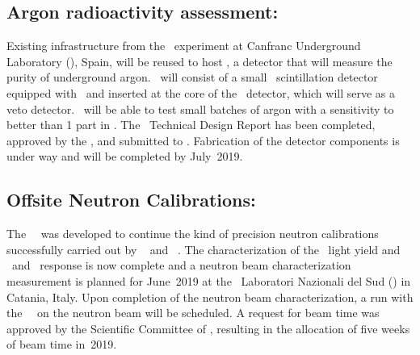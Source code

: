\subsection{Argon radioactivity assessment: \DArT}
\label{sec:DArT}

Existing infrastructure from the \ArDM\ experiment at Canfranc Underground Laboratory (\LSC), Spain, will be reused to host \DArT, a detector that will measure the purity of underground argon.  \DArT\ will consist of a small \DArTVolume\ scintillation detector equipped with \SiPMs\ and inserted at the core of the \ArDM\ detector, which will serve as a veto detector.  \DArT\ will be able to test small batches of argon with a sensitivity to  better than 1 part in \DArTUArSensitivityUltimate.  The \DArT\ Technical Design Report has been completed, approved by the \GADMC, and submitted to \LSC.  Fabrication of the detector components is under way and will be completed by July~2019.

\subsection{Offsite Neutron Calibrations: \ReD}
\label{sec:ReD}

The \ReD\ \LArTPC\ was developed to continue the kind of precision neutron calibrations successfully carried out by \SCENE~\cite{Alexander:2013ke,Cao:2014tw,Cao:2015ks} and \ARIS~\cite{Agnes:2018cn}.  The characterization of the \ReD\ light yield and \SOne\ and \STwo\ response is now complete and a neutron beam characterization measurement is planned for June~2019 at the \INFN\ Laboratori Nazionali del Sud (\LNS) in Catania, Italy.  Upon completion of the neutron beam characterization, a run with the \ReD\ \LArTPC\ on the neutron beam will be scheduled.  A request for beam time was approved by the Scientific Committee of \LNS, resulting in the allocation of five weeks of beam time in~2019.
